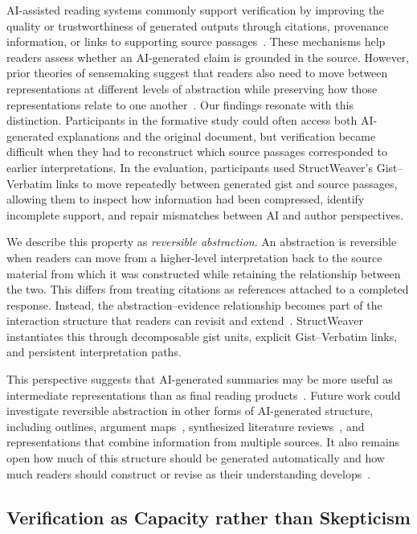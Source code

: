 \documentclass[manuscript,review,anonymous]{acmart}
\begin{document}
AI-assisted reading systems commonly support verification by improving the quality or trustworthiness of generated outputs through citations, provenance information, or links to supporting source passages~\cite{scholarphi,papertrail,tabletale,kambhamettu2024traceabletextdeepeningreading}. These mechanisms help readers assess whether an AI-generated claim is grounded in the source. However, prior theories of sensemaking suggest that readers also need to move between representations at different levels of abstraction while preserving how those representations relate to one another~\cite{pirolli2005sensemaking,10.1145/169059.169209}. Our findings resonate with this distinction. Participants in the formative study could often access both AI-generated explanations and the original document, but verification became difficult when they had to reconstruct which source passages corresponded to earlier interpretations. In the evaluation, participants used StructWeaver's Gist--Verbatim links to move repeatedly between generated gist and source passages, allowing them to inspect how information had been compressed, identify incomplete support, and repair mismatches between AI and author perspectives.

We describe this property as \textit{reversible abstraction}. An abstraction is reversible when readers can move from a higher-level interpretation back to the source material from which it was constructed while retaining the relationship between the two. This differs from treating citations as references attached to a completed response. Instead, the abstraction--evidence relationship becomes part of the interaction structure that readers can revisit and extend~\cite{thuring1995hypermedia,hollan2000distributed}. StructWeaver instantiates this through decomposable gist units, explicit Gist--Verbatim links, and persistent interpretation paths.

This perspective suggests that AI-generated summaries may be more useful as intermediate representations than as final reading products~\cite{pirolli2005sensemaking}. Future work could investigate reversible abstraction in other forms of AI-generated structure, including outlines, argument maps~\cite{DWYER201016}, synthesized literature reviews~\cite{Synergi}, and representations that combine information from multiple sources. It also remains open how much of this structure should be generated automatically and how much readers should construct or revise as their understanding develops~\cite{vidsense}.

\subsection{Verification as Capacity rather than Skepticism}
\end{document}
